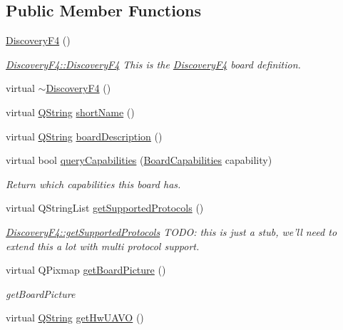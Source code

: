 \subsection*{Public Member Functions}
\begin{DoxyCompactItemize}
\item 
\hyperlink{group___boards___stm_gac87884749e97c313a7ae0f297c4fea34}{Discovery\-F4} ()
\begin{DoxyCompactList}\small\item\em \hyperlink{group___boards___stm_gac87884749e97c313a7ae0f297c4fea34}{Discovery\-F4\-::\-Discovery\-F4} This is the \hyperlink{class_discovery_f4}{Discovery\-F4} board definition. \end{DoxyCompactList}\item 
virtual \hyperlink{group___boards___stm_ga9efdcb4c04776b36e256d689941943ea}{$\sim$\-Discovery\-F4} ()
\item 
virtual \hyperlink{group___u_a_v_objects_plugin_gab9d252f49c333c94a72f97ce3105a32d}{Q\-String} \hyperlink{group___boards___stm_ga5c9636450b313e75d14d0277542ca1b7}{short\-Name} ()
\item 
virtual \hyperlink{group___u_a_v_objects_plugin_gab9d252f49c333c94a72f97ce3105a32d}{Q\-String} \hyperlink{group___boards___stm_gaaa661c5a3b6c7fe84f8736ce1c090860}{board\-Description} ()
\item 
virtual bool \hyperlink{group___boards___stm_ga81561678eef8f622b3cfe9f7af2aa762}{query\-Capabilities} (\hyperlink{group___core_plugin_ga01b09218f2a13aaeee6db007ac6bd967}{Board\-Capabilities} capability)
\begin{DoxyCompactList}\small\item\em Return which capabilities this board has. \end{DoxyCompactList}\item 
virtual Q\-String\-List \hyperlink{group___boards___stm_ga1db1bd4a572120a9b4224f4eb643ef2f}{get\-Supported\-Protocols} ()
\begin{DoxyCompactList}\small\item\em \hyperlink{group___boards___stm_ga1db1bd4a572120a9b4224f4eb643ef2f}{Discovery\-F4\-::get\-Supported\-Protocols} T\-O\-D\-O\-: this is just a stub, we'll need to extend this a lot with multi protocol support. \end{DoxyCompactList}\item 
virtual Q\-Pixmap \hyperlink{group___boards___stm_gaec756cbf9ef744354fcb5eb274ba2b94}{get\-Board\-Picture} ()
\begin{DoxyCompactList}\small\item\em get\-Board\-Picture \end{DoxyCompactList}\item 
virtual \hyperlink{group___u_a_v_objects_plugin_gab9d252f49c333c94a72f97ce3105a32d}{Q\-String} \hyperlink{group___boards___stm_gad4fb3147a8ceb8b1106048d7b44d92e9}{get\-Hw\-U\-A\-V\-O} ()
\end{DoxyCompactItemize}
